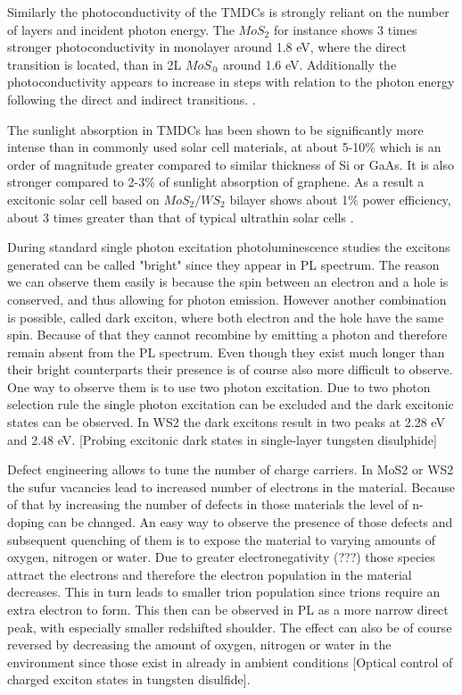 \documentclass[12pt]{article}
\begin{document}
	Similarly the photoconductivity of the TMDCs is strongly reliant on the number of layers and incident photon energy. The $MoS_2$ for instance shows 3 times stronger photoconductivity in monolayer around 1.8 eV, where the direct transition is located, than in 2L $MoS_@$ around 1.6 eV. Additionally the photoconductivity appears to increase in steps with relation to the photon energy following the direct and indirect transitions. \cite{ElectronicsAndOptoelectronicsOfTwo-dimensionalTransitionMetalDichalcogenides}.
		
	The sunlight absorption in TMDCs has been shown to be significantly more intense than in commonly used solar cell materials, at about 5-10$\%$ which is an order of magnitude greater compared to similar thickness of Si or GaAs. It is also stronger compared to 2-3$\%$ of sunlight absorption of graphene. As a result a excitonic solar cell based on $MoS_2/WS_2$ bilayer shows about 1$\%$ power efficiency, about 3 times greater than that of typical ultrathin solar cells \cite{ExtraordinarySunlightAbsorptionAndOneNanometerThickPhotovoltaicsUsingTwo-DimensionalMonolayerMaterials}.
	
	During standard single photon excitation photoluminescence studies the excitons generated can be called "bright" since they appear in PL spectrum. The reason we can observe them easily is because the spin between an electron and a hole is conserved, and thus allowing for photon emission. However another combination is possible, called dark exciton, where both electron and the hole have the same spin. Because of that they cannot recombine by emitting a photon and therefore remain absent from the PL spectrum. Even though they exist much longer than their bright counterparts their presence is of course also more difficult to observe. One way to observe them is to use two photon excitation. Due to two photon selection rule the single photon excitation can be excluded and the dark excitonic states can be observed. In WS2 the dark excitons result in two peaks at 2.28 eV and 2.48 eV. [Probing excitonic dark states in single-layer tungsten disulphide]
	
	Defect engineering allows to tune the number of charge carriers. In MoS2 or WS2 the sufur vacancies lead to increased number of electrons in the material. Because of that by increasing the number of defects in those materials the level of n-doping can be changed. An easy way to observe the presence of those defects and subsequent quenching of them is to expose the material to varying amounts of oxygen, nitrogen or water. Due to greater electronegativity (???) those species attract the electrons and therefore the electron population in the material decreases. This in turn leads to smaller trion population since trions require an extra electron to form. This then can be observed in PL as a more narrow direct peak, with especially smaller redshifted shoulder. The effect can also be of course reversed by decreasing the amount of oxygen, nitrogen or water in the environment since those exist in already in ambient conditions [Optical control of charged exciton states in tungsten disulfide].
	
\end{document}

